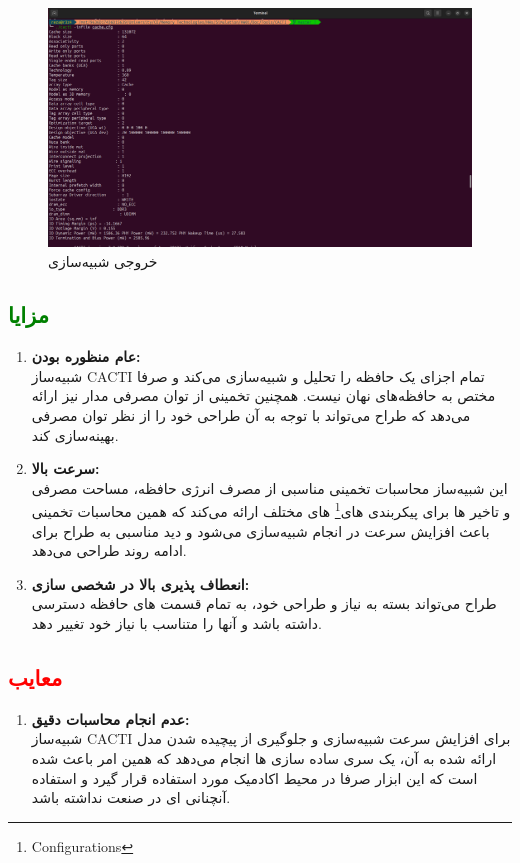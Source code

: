 \documentclass[12pt]{exam}
\begin{document}
\begin{questions}
\begin{figure}[h]
	\centering
	\includegraphics[width=1\textwidth]{images/img5}
	\caption{خروجی شبیه‌سازی}
	\label{خروجی شبیه‌سازی ککتای}
\end{figure}


\subsection{\textcolor{green}{مزایا}}

\begin{enumerate}
	\item \textbf{عام منظوره بودن:}\\
	شبیه‌ساز CACTI تمام اجزای یک حافظه را تحلیل و شبیه‌سازی می‌کند و صرفا مختص به حافظه‌های نهان نیست. همچنین تخمینی از توان مصرفی مدار نیز ارائه می‌دهد که طراح می‌تواند با توجه به آن طراحی خود را از نظر توان مصرفی بهینه‌سازی کند.
	
	\item \textbf{سرعت بالا: }\\
	این شبیه‌ساز محاسبات تخمینی مناسبی از مصرف انرژی حافظه، مساحت مصرفی و تاخیر ها برای پیکر‌بندی های\footnote{Configurations} های مختلف ارائه می‌کند که همین محاسبات تخمینی باعث افزایش سرعت در انجام شبیه‌سازی می‌شود و دید مناسبی به طراح برای ادامه روند طراحی می‌دهد.
	
	\item \textbf{انعطاف پذیری بالا در شخصی سازی: }\\
	طراح می‌تواند بسته به نیاز و طراحی خود، به تمام قسمت های حافظه دسترسی داشته باشد و آنها را متناسب با نیاز خود تغییر دهد.
\end{enumerate}


\subsection{\textcolor{red}{معایب}}
\begin{enumerate}
	\item \textbf{عدم انجام محاسبات دقیق: }\\
	شبیه‌ساز CACTI برای افزایش سرعت شبیه‌سازی و جلوگیری از پیچیده شدن مدل ارائه شده به آن، یک سری ساده سازی ها انجام می‌دهد که همین امر باعث شده است که این ابزار صرفا در محیط اکادمیک مورد استفاده قرار گیرد و استفاده آنچنانی ای در صنعت نداشته باشد.
	

\end{enumerate}
\end{questions}
\end{document}
